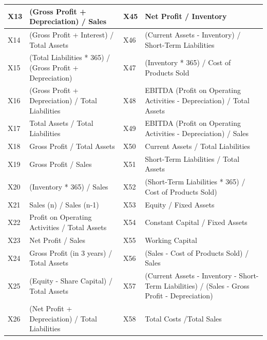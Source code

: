 \begin{table}
\begin{center}
\begin{tabular}{|p{0.65cm}|p{6.5cm}|p{0.65cm}|p{6.5cm}|}
    X13 & (Gross Profit + Depreciation) / Sales & X45 & Net Profit / Inventory \\ \hline

    X14 & (Gross Profit + Interest) / Total Assets & X46 & (Current Assets - Inventory) / Short-Term Liabilities \\ \hline

    X15 & (Total Liabilities * 365) / (Gross Profit + Depreciation) & X47 & (Inventory * 365) / Cost of Products Sold \\ \hline

    X16 & (Gross Profit + Depreciation) / Total Liabilities & X48 & EBITDA (Profit on Operating Activities - Depreciation) / Total Assets \\ \hline

    X17 & Total Assets / Total Liabilities & X49 & EBITDA (Profit on Operating Activities - Depreciation) / Sales \\ \hline

    X18 & Gross Profit / Total Assets & X50 & Current Assets / Total Liabilities \\ \hline

    X19 & Gross Profit / Sales & X51 & Short-Term Liabilities / Total Assets \\ \hline

    X20 & (Inventory * 365) / Sales & X52 & (Short-Term Liabilities * 365) / Cost of Products Sold) \\ \hline

    X21 & Sales (n) / Sales (n-1) & X53 & Equity / Fixed Assets \\ \hline

    X22 & Profit on Operating Activities / Total Assets & X54 & Constant Capital / Fixed Assets \\ \hline

    X23 & Net Profit / Sales & X55 & Working Capital \\ \hline

    X24 & Gross Profit (in 3 years) / Total Assets & X56 & (Sales - Cost of Products Sold) / Sales \\ \hline

    X25 & (Equity - Share Capital) / Total Assets & X57 & (Current Assets - Inventory - Short-Term Liabilities) / (Sales - Gross Profit - Depreciation) \\ \hline

    X26 & (Net Profit + Depreciation) / Total Liabilities & X58 & Total Costs /Total Sales \\ \hline


\end{tabular}
\end{center}
\end{table}
